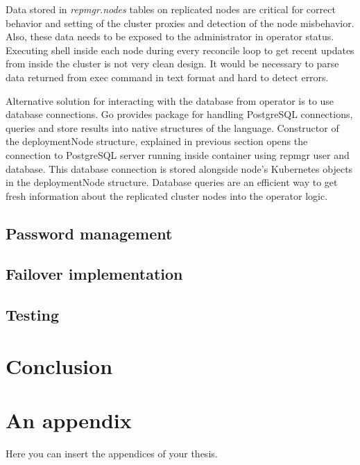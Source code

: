 \documentclass[
  digital, %
  twoside, %
  table,   %
  lof,     %
  lot,     %
]{fithesis3}
\begin{document}
Data stored in \textit{repmgr.nodes} tables on replicated nodes are critical for correct behavior and setting of the cluster proxies and detection of the node misbehavior. Also, these data needs to be exposed to the administrator in operator status. Executing shell inside each node during every reconcile loop to get recent updates from inside the cluster is not very clean design. It would be necessary to parse data returned from exec command in text format and hard to detect errors.

Alternative solution for interacting with the database from operator is to use database connections. Go provides package for handling PostgreSQL connections, queries and store results into native structures of the language. Constructor of the deploymentNode structure, explained in previous section opens the connection to PostgreSQL server running inside container using repmgr user and database. This database connection is stored alongside node's Kubernetes objects in the deploymentNode structure. Database queries are an efficient way to get fresh information about the replicated cluster nodes into the operator logic.

\section{Password management}
\section{Failover implementation}
\section{Testing}
\chapter{Conclusion}

\appendix %
\chapter{An appendix}
Here you can insert the appendices of your thesis.
\end{document}
